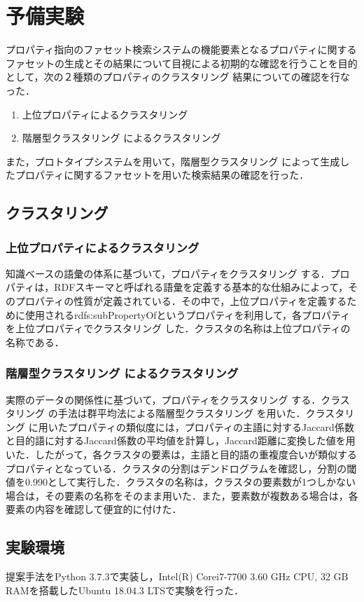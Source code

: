 \section{予備実験}
\label{sec:experiments}
プロパティ指向のファセット検索システムの機能要素となるプロパティに関するファセットの生成とその結果について目視による初期的な確認を行うことを目的として，次の２種類のプロパティのクラスタリング 結果についての確認を行なった．
\begin{enumerate}
	\item 上位プロパティによるクラスタリング
	\item 階層型クラスタリング によるクラスタリング
\end{enumerate}
また，プロトタイプシステムを用いて，階層型クラスタリング によって生成したプロパティに関するファセットを用いた検索結果の確認を行った．
%
\subsection{クラスタリング }
\subsubsection{上位プロパティによるクラスタリング }
知識ベースの語彙の体系に基づいて，プロパティをクラスタリング する．プロパティは，RDFスキーマと呼ばれる語彙を定義する基本的な仕組みによって，そのプロパティの性質が定義されている．その中で，上位プロパティを定義するために使用されるrdfs:subPropertyOfというプロパティを利用して，各プロパティを上位プロパティでクラスタリング  した．クラスタの名称は上位プロパティの名称である．
\subsubsection{階層型クラスタリング によるクラスタリング }
実際のデータの関係性に基づいて，プロパティをクラスタリング する．クラスタリング の手法は群平均法による階層型クラスタリング を用いた．クラスタリング に用いたプロパティの類似度には，プロパティの主語に対するJaccard係数と目的語に対するJaccard係数の平均値を計算し，Jaccard距離に変換した値を用いた．したがって，各クラスタの要素は，主語と目的語の重複度合いが類似するプロパティとなっている．クラスタの分割はデンドログラムを確認し，分割の閾値を0.990として実行した．クラスタの名称は，クラスタの要素数が1つしかない場合は，その要素の名称をそのまま用いた．また，要素数が複数ある場合は，各要素の内容を確認して便宜的に付けた．
%
\subsection{実験環境}
\label{sec:environment}
提案手法をPython 3.7.3で実装し，Intel(R) Core\texttrademark i7-7700 3.60 GHz CPU, 32 GB RAMを搭載したUbuntu 18.04.3 LTSで実験を行った．
%
